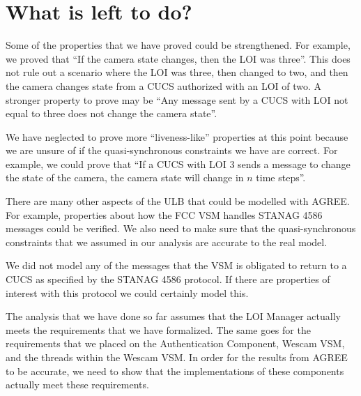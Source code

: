 \documentclass{llncs}
\begin{document}
\section{What is left to do?}

Some of the properties that we have proved could be strengthened.  For example, we proved that ``If the camera state changes, then the LOI was three''.  This does not rule out a scenario where the LOI was three, then changed to two, and then the camera changes state from a CUCS authorized with an LOI of two.  A stronger property to prove may be ``Any message sent by a CUCS with LOI not equal to three does not change the camera state''. 

We have neglected to prove more ``liveness-like'' properties at this point because we are unsure of if the quasi-synchronous constraints we have are correct.  For example, we could prove that ``If a CUCS with LOI 3 sends a message to change the state of the camera, the camera state will change in $n$ time steps''.

There are many other aspects of the ULB that could be modelled with AGREE. For example, properties about how the FCC VSM handles STANAG 4586 messages could be verified.  We also need to make sure that the quasi-synchronous constraints that we assumed in our analysis are accurate to the real model.

We did not model any of the messages that the VSM is obligated to return to a CUCS as specified by the STANAG 4586 protocol.  If there are properties of interest with this protocol we could certainly model this.

The analysis that we have done so far assumes that the LOI Manager actually meets the requirements that we have formalized.  The same goes for the requirements that we placed on the Authentication Component, Wescam VSM, and the threads within the Wescam VSM.  In order for the results from AGREE to be accurate, we need to show that the implementations of these components actually meet these requirements.
\end{document}
